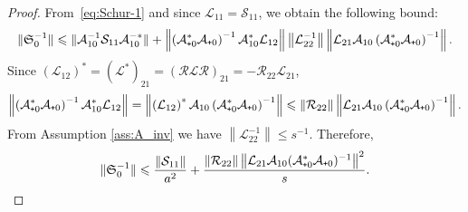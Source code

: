 \documentclass{article}
\newcommand{\cL}{\mathcal{L}}
\newcommand{\cLs}{\mathcal{S}}
\newcommand{\cLa}{\mathcal{A}}
\newcommand{\Schur}{\mathfrak{S}_0}
\newcommand{\cR}{\mathcal{R}}
\newcommand{\subplus}{\textnormal{\texttt{+}}}
\renewcommand{\leq}{\leqslant}
\renewcommand{\le}{\leqslant}
\begin{document}
\begin{proof}
  From~\eqref{eq:Schur-1} and since $\cL_{11} = \cLs_{11}$, we obtain the following bound:
  \[
    \|\Schur^{-1}\| \le \|\cLa_{10}^{-1} \cLs_{11} \cLa_{10}^{-*}\| + \left\|\left(\cLa_{\subplus0}^*\cLa_{\subplus0}\right)^{-1} \cLa_{10}^{*}\cL_{12} \right\|\left\|\cL_{22}^{-1} \right\|\left\|\cL_{21} \cLa_{10} \left(\cLa_{\subplus0}^*\cLa_{\subplus0}\right)^{-1}\right\|.
  \]
  Since $(\cL_{12})^{*} = (\cL^{*})_{21} = (\cR \cL \cR)_{21} = -\cR_{22} \cL_{21}$,
  \[
    \left\|\left(\cLa_{\subplus0}^*\cLa_{\subplus0}\right)^{-1} \cLa_{10}^{*}\cL_{12} \right\|
    = \left\|\left(\cL_{12}\right)^* \cLa_{10} \left(\cLa_{\subplus0}^*\cLa_{\subplus0}\right)^{-1} \right\|
    \leq \|\cR_{22}\|\left\|\cL_{21} \cLa_{10} \left(\cLa_{\subplus0}^*\cLa_{\subplus0}\right)^{-1}\right\|.
  \]
From Assumption \ref{ass:A_inv} we have $\left\|\cL_{22}^{-1} \right\| \leq s^{-1}$. Therefore,
\begin{equation}
  \label{eq:Schur_inv_bound}
  \|\Schur^{-1}\| \le \frac {\|\cLs_{11}\|} {a^{2}} + \frac {\|\cR_{22}\|\left\|\cL_{21} \cLa_{10}(\cLa_{\subplus0}^{*}\cLa_{\subplus0})^{-1}\right\|^{2}}{s}.
\end{equation}


\end{proof}
\end{document}
